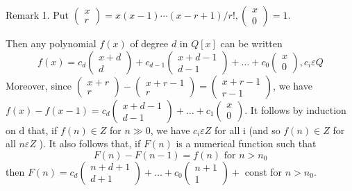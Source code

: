 Remark 1. Put $\left(\begin{array}{l}x \\ r\end{array}\right)=x(x-1) \cdots(x-r+1) / r !,\left(\begin{array}{l}x \\ 0\end{array}\right)=1$.

Then any polynomial $f(x)$ of degree $d$ in $Q[x]$ can be written
$$
f(x)=c_{d}\left(\begin{array}{c}
x+d \\
d
\end{array}\right)+c_{d-1}\left(\begin{array}{c}
x+d-1 \\
d-1
\end{array}\right)+\ldots+c_{0}\left(\begin{array}{l}
x \\
0
\end{array}\right), c_{i} \varepsilon Q
$$
Moreover, since $\left(\begin{array}{c}x+r \\ r\end{array}\right)-\left(\begin{array}{c}x+r-1 \\ r\end{array}\right)=\left(\begin{array}{c}x+r-1 \\ r-1\end{array}\right)$, we have $f(x)-f(x-1)=c_{d}\left(\begin{array}{c}x+d-1 \\ d-1\end{array}\right)+\ldots+c_{1}\left(\begin{array}{l}x \\ 0\end{array}\right)$. It follows by induction on d that, if $f(n) \in Z$ for $n \gg 0$, we have $c_{i} \varepsilon Z$ for all i (and so $f(n) \in Z$ for all $n \varepsilon Z$ ). It also follows that, if $F(n)$ is a numerical function such that
$$
F(n)-F(n-1)=f(n) \text { for } n>n_{0}
$$
then $F(n)=c_{d}\left(\begin{array}{c}n+d+1 \\ d+1\end{array}\right)+\ldots+c_{0}\left(\begin{array}{c}n+1 \\ 1\end{array}\right)+$ const for $n>n_{0}$.

